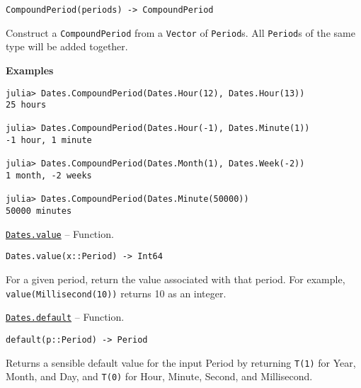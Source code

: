 \begin{adjustwidth}{2em}{0pt}


\begin{verbatim}
CompoundPeriod(periods) -> CompoundPeriod
\end{verbatim}

Construct a \texttt{CompoundPeriod} from a \texttt{Vector} of \texttt{Period}s. All \texttt{Period}s of the same type will be added together.

\textbf{Examples}


\begin{verbatim}
julia> Dates.CompoundPeriod(Dates.Hour(12), Dates.Hour(13))
25 hours

julia> Dates.CompoundPeriod(Dates.Hour(-1), Dates.Minute(1))
-1 hour, 1 minute

julia> Dates.CompoundPeriod(Dates.Month(1), Dates.Week(-2))
1 month, -2 weeks

julia> Dates.CompoundPeriod(Dates.Minute(50000))
50000 minutes
\end{verbatim}



\end{adjustwidth}
\hypertarget{6471383377711200525}{}
\hyperlink{6471383377711200525}{\texttt{Dates.value}}  -- {Function.}

\begin{adjustwidth}{2em}{0pt}


\begin{verbatim}
Dates.value(x::Period) -> Int64
\end{verbatim}

For a given period, return the value associated with that period.  For example, \texttt{value(Millisecond(10))} returns 10 as an integer.



\end{adjustwidth}
\hypertarget{9890661094020401012}{}
\hyperlink{9890661094020401012}{\texttt{Dates.default}}  -- {Function.}

\begin{adjustwidth}{2em}{0pt}


\begin{verbatim}
default(p::Period) -> Period
\end{verbatim}

Returns a sensible {\textquotedbl}default{\textquotedbl} value for the input Period by returning \texttt{T(1)} for Year, Month, and Day, and \texttt{T(0)} for Hour, Minute, Second, and Millisecond.



\end{adjustwidth}


